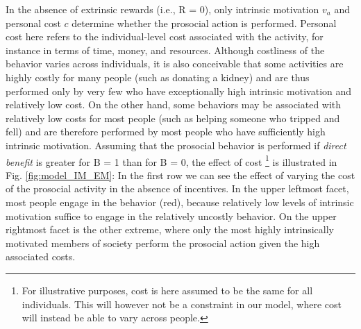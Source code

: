 \documentclass[AER]{AEA}
\begin{document}
In the absence of extrinsic rewards (i.e., R = 0), only intrinsic motivation $v_{a}$ and personal cost $c$ determine whether the prosocial action is performed. Personal cost here refers to the individual-level cost associated with the activity, for instance in terms of time, money, and resources. Although costliness of the behavior varies across individuals, it is also conceivable that some activities are highly costly for many people (such as donating a kidney) and are thus performed only by very few who have exceptionally high intrinsic motivation and relatively low cost. On the other hand, some behaviors may be associated with relatively low costs for most people (such as helping someone who tripped and fell) and are therefore performed by most people who have sufficiently high intrinsic motivation. Assuming that the prosocial behavior is performed if \textit{direct benefit} is greater for B = 1 than for B = 0, the effect of cost \footnote{For illustrative purposes, cost is here assumed to be the same for all individuals. This will however not be a constraint in our model, where cost will instead be able to vary across people.} is illustrated in Fig.  \ref{fig:model_IM_EM}: In the first row we can see the effect of varying the cost of the prosocial activity in the absence of incentives. In the upper leftmost facet, most people engage in the behavior (red), because relatively low levels of intrinsic motivation suffice to engage in the relatively uncostly behavior. On the upper rightmost facet is the other extreme, where only the most highly intrinsically motivated members of society perform the prosocial action given the high associated costs.
\end{document}
